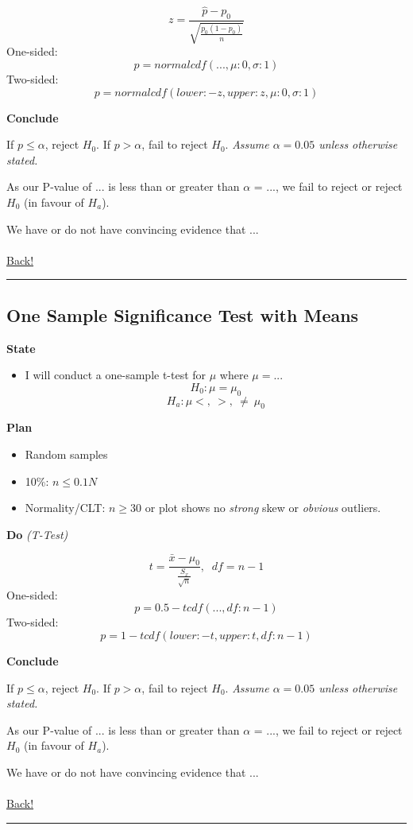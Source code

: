 \documentclass[main]{subfiles}
\begin{document}
\[z = \frac{\hat{p} - p_0}{\sqrt{\frac{p_0(1 - p_0)}{n}}}\]
One-sided: \[p = normalcdf(..., \mu: 0, \sigma: 1)\]
Two-sided: \[p = normalcdf(lower: -z, upper: z, \mu: 0, \sigma: 1)\]

\noindent\textbf{Conclude}

If $p \leq \alpha$, reject $H_0$. If $p > \alpha$, fail to reject $H_0$.
\textit{Assume $\alpha = 0.05$ unless otherwise stated.}

As our P-value of ... is less than or greater than $\alpha$ = ..., we fail to reject or reject $H_0$ (in favour of $H_a$). 

We have or do not have convincing evidence that ...
\\~\\
\noindent\hyperlink{toc}{Back!}
\newline\hrule


\subsection{One Sample Significance Test with Means}
\textbf{State}
\begin{itemize}
    \item I will conduct a one-sample t-test for $\mu$ where $\mu = ...$
    \[H_0 : \mu = \mu_0\]
    \[H_a : \mu <,\:>,\:\neq\ \mu_0\]
\end{itemize}
\textbf{Plan}
\begin{itemize}
    \item Random samples
    \item 10\%: $n \leq 0.1N$
    \item Normality/CLT: $n \geq 30$ or plot shows no \textit{strong} skew or \textit{obvious} outliers.
\end{itemize}
\textbf{Do} \textit{(T-Test)}

\[t = \frac{\bar{x} - \mu_0}{\frac{S_x}{\sqrt{n}}},\;\;df = n - 1\]
One-sided: \[p = 0.5 - tcdf(..., df: n - 1)\]
Two-sided: \[p = 1 - tcdf(lower: -t, upper: t, df: n - 1)\]

\noindent\textbf{Conclude}

If $p \leq \alpha$, reject $H_0$. If $p > \alpha$, fail to reject $H_0$.
\textit{Assume $\alpha = 0.05$ unless otherwise stated.}

As our P-value of ... is less than or greater than $\alpha$ = ..., we fail to reject or reject $H_0$ (in favour of $H_a$). 

We have or do not have convincing evidence that ...
\\~\\
\noindent\hyperlink{toc}{Back!}
\newline\hrule
\end{document}
